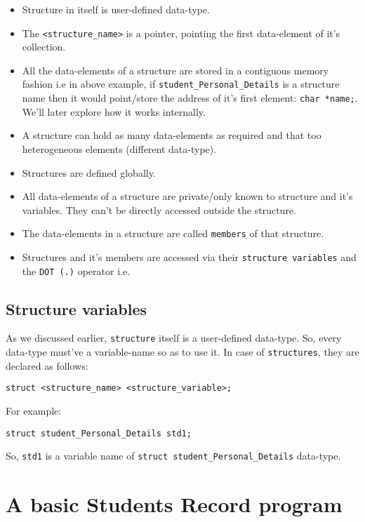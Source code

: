 \documentclass[11pt]{article}
\begin{document}
\begin{itemize}
\item Structure in itself is user-defined data-type.
\item The \texttt{<structure\_name>} is a pointer, pointing the first data-element of
it’s collection.
\item All the data-elements of a structure are stored in a contiguous memory fashion
i.e in above example, if \texttt{student\_Personal\_Details} is a structure name then it would
point/store the address of it’s first element: \texttt{char *name;}. We’ll later
explore how it works internally.
\item A structure can hold as many data-elements as required and that too
heterogeneous elements (different data-type).
\item Structures are defined globally.
\item All data-elements of a structure are private/only known to structure and
it’s variables. They can’t be directly accessed outside the structure.
\item The data-elements in a structure are called \texttt{members} of that structure.
\item Structures and it’s members are accessed via their \texttt{structure variables} and the
\texttt{DOT (.)} operator i.e.
\end{itemize}

\subsection{Structure variables}
\label{sec:orgfee4e9f}

As we discussed earlier, \texttt{structure} itself is a user-defined data-type. So,
every data-type must’ve a variable-name so as to use it. In case of
\texttt{structures}, they are declared as follows:

\begin{verbatim}
struct <structure_name> <structure_variable>; 
\end{verbatim}

For example:

\begin{verbatim}
struct student_Personal_Details std1;
\end{verbatim}

So, \texttt{std1} is a variable name of \texttt{struct student\_Personal\_Details} data-type.

\section{A basic Students Record program}
\label{sec:org12c8106}
\end{document}
